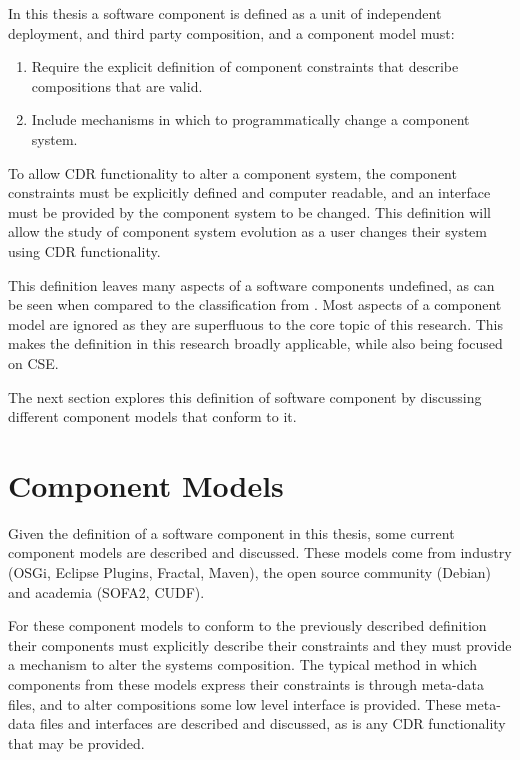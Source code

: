 In this thesis a software component is defined as a unit of independent deployment, and third party composition,
and a component model must:
\begin{enumerate}
  \item Require the explicit definition of component constraints that describe compositions that are valid. 
  \item Include mechanisms in which to programmatically change a component system.
\end{enumerate}

To allow CDR functionality to alter a component system, the component constraints must be explicitly defined and computer readable,
and an interface must be provided by the component system to be changed. 
This definition will allow the study of component system evolution as a user changes their system using CDR functionality.

This definition leaves many aspects of a software components undefined, as can be seen when compared to the classification from \citep{Crnkovic2011}.
Most aspects of a component model are ignored as they are superfluous to the core topic of this research.
This makes the definition in this research broadly applicable, while also being focused on CSE.

The next section explores this definition of software component by discussing different component models that conform to it.

\section{Component Models}
\label{background.models}
Given the definition of a software component in this thesis, some current component models are described and discussed.
These models come from industry (OSGi, Eclipse Plugins, Fractal, Maven), the open source community (Debian) and academia (SOFA2, CUDF).

For these component models to conform to the previously described definition
their components must explicitly describe their constraints and they must provide a mechanism to alter the systems composition.
The typical method in which components from these models express their constraints is through meta-data files,
and to alter compositions some low level interface is provided.
These meta-data files and interfaces are described and discussed, as is any CDR functionality that may be provided.

